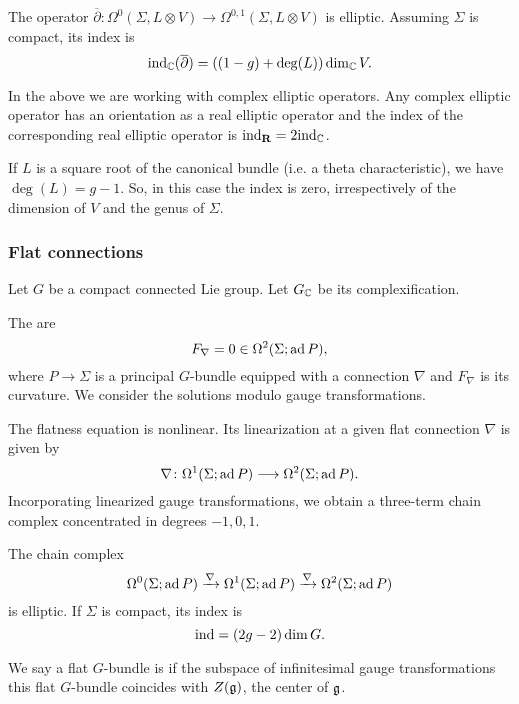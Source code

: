 \begin{prop}
The operator $\overline{\partial}\colon \Omega^0(\Sigma, L\otimes V)\rightarrow \Omega^{0, 1}(\Sigma, L\otimes V)$ is elliptic. Assuming $\Sigma$ is compact, its index is
\[\mathrm{ind}_{\mathbb{C}}(\overline{\partial}) = ((1-g) + \deg(L))\dim_{\mathbb{C}} V.\]
\end{prop}

\begin{remark}
In the above we are working with complex elliptic operators. Any complex elliptic operator has an orientation as a real elliptic operator and the index of the corresponding real elliptic operator is $\mathrm{ind}_{\mathbf{R}}=2\mathrm{ind}_{\mathbb{C}}$.
\end{remark}

\begin{remark}
If $L$ is a square root of the canonical bundle (i.e. a theta characteristic), we have $\deg(L) = g-1$. So, in this case the index is zero, irrespectively of the dimension of $V$ and the genus of $\Sigma$.
\end{remark}

\subsubsection{Flat connections}

Let $G$ be a compact connected Lie group. Let $G_{\mathbb{C}}$ be its complexification.

\begin{defn}
The  are
\[F_\nabla = 0\in\Omega^2(\Sigma; \operatorname{ad} P),\]
where $P\rightarrow \Sigma$ is a principal $G$-bundle equipped with a connection $\nabla$ and $F_\nabla$ is its curvature. We consider the solutions modulo gauge transformations.
\end{defn}

The flatness equation is nonlinear. Its linearization at a given flat connection $\nabla$ is given by
\[\nabla\colon \Omega^1(\Sigma; \operatorname{ad} P)\longrightarrow \Omega^2(\Sigma; \operatorname{ad} P).\]
Incorporating linearized gauge transformations, we obtain a three-term chain complex concentrated in degrees $-1, 0, 1$.

\begin{prop}
The chain complex
\[\Omega^0(\Sigma; \operatorname{ad} P)\xrightarrow{\nabla} \Omega^1(\Sigma; \operatorname{ad} P)\xrightarrow{\nabla} \Omega^2(\Sigma; \operatorname{ad} P)\]
is elliptic. If $\Sigma$ is compact, its index is
\[\mathrm{ind}  = (2g-2)\dim G.\]
\end{prop}

\begin{defn}
We say a flat $G$-bundle is  if the subspace of infinitesimal gauge transformations this flat $G$-bundle coincides with $Z(\mathfrak{g})$, the center of $\mathfrak{g}$.
\end{defn}

